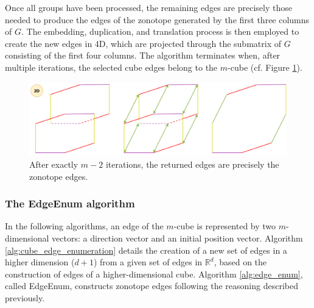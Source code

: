 Once all groups have been processed, the remaining edges are precisely those needed to produce the edges of the zonotope generated by the first three columns of $G$. The embedding, duplication, and translation process is then employed to create the new edges in 4D, which are projected through the submatrix of $G$ consisting of the first four columns. The algorithm terminates when, after multiple iterations, the selected cube edges belong to the $m$-cube (cf. Figure \ref{fig:zonotope_edges_elimination_end}).

\begin{figure}[!htb]
  \captionsetup{justification=centering}
  
  \centering
  \includegraphics[trim={0 0 0 0},clip,width=1\linewidth]{img/chapter_2/zonotope_edges_elimination_end.pdf}

  \caption{After exactly $m-2$ iterations, the returned edges are precisely the zonotope edges.}
  \label{fig:zonotope_edges_elimination_end}
\end{figure}


\clearpage 
\subsubsection*{The EdgeEnum algorithm}

In the following algorithms, an edge of the $m$-cube is represented by two $m$-dimensional vectors: a direction vector and an initial position vector. Algorithm \ref{alg:cube_edge_enumeration} details the creation of a new set of edges in a higher dimension ($d+1$) from a given set of edges in $\mathbb{R}^d$, based on the construction of edges of a higher-dimensional cube. Algorithm \ref{alg:edge_enum}, called EdgeEnum, constructs zonotope edges following the reasoning described previously.

